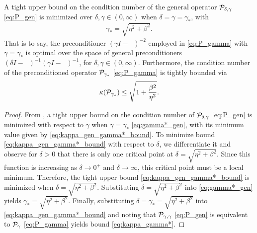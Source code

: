 \documentclass[review]{siamart}
\DeclareMathOperator{\cL}{\widehat{\mathcal{L}}}
\begin{document}
\begin{corollary}[Optimal preconditioning with $\gamma = \delta$]
\label{cor:cond}
A tight upper bound on the condition number of the general operator ${\cal P}_{\delta,\gamma}$ \eqref{eq:P_gen} is minimized over $\delta, \gamma \in (0, \infty)$ when $\delta = \gamma = \gamma_*$, with
\begin{align} \label{eq:gamma*}
\gamma_* = \sqrt{\eta^2 + \beta^2}.
\end{align}
That is to say, the preconditioner $(\gamma I - \cL)^{-2}$ employed in \eqref{eq:P_gamma} with $\gamma = \gamma_*$ is optimal over the space of general preconditioners $(\delta I - \cL)^{-1}(\gamma I - \cL)^{-1}$, for $\delta, \gamma \in (0,\infty)$. Furthermore, the condition number of the preconditioned operator ${\cal P}_{\gamma_*}$ \eqref{eq:P_gamma} is tightly bounded via
\begin{align} \label{eq:kappa_gamma*}
\kappa({\cal P}_{\gamma_*}) \leq \sqrt{1 + \frac{\beta^2}{\eta^2}}.
\end{align}
\end{corollary}
\begin{proof}
From , a tight upper bound on the condition number of ${\cal P}_{\delta,\gamma}$ \eqref{eq:P_gen} is minimized with respect to $\gamma$ when $\gamma = \gamma_*$ \eqref{eq:gamma*_gen}, with its minimum value given by  \eqref{eq:kappa_gen_gamma*_bound}. To minimize bound \eqref{eq:kappa_gen_gamma*_bound} with respect to $\delta$, we differentiate it and observe for $\delta > 0$ that there is only one critical point at $\delta = \sqrt{\eta^2+ \beta^2}$. Since this function is increasing as $\delta \to 0^+$ and $\delta \to \infty$, this critical point must be a local minimum. Therefore, the tight upper bound \eqref{eq:kappa_gen_gamma*_bound} is minimized when $\delta = \sqrt{\eta^2+ \beta^2}$. Substituting $\delta =  \sqrt{\eta^2+ \beta^2}$ into \eqref{eq:gamma*_gen} yields $\gamma_* = \sqrt{\eta^2 + \beta^2}$. Finally, substituting $\delta = \gamma_* = \sqrt{\eta^2 + \beta^2}$ into \eqref{eq:kappa_gen_gamma*_bound} and noting that  ${\cal P}_{\gamma,\gamma}$ \eqref{eq:P_gen} is equivalent to ${\cal P}_{\gamma}$ \eqref{eq:P_gamma} yields bound \eqref{eq:kappa_gamma*}.
\end{proof}
\end{document}
